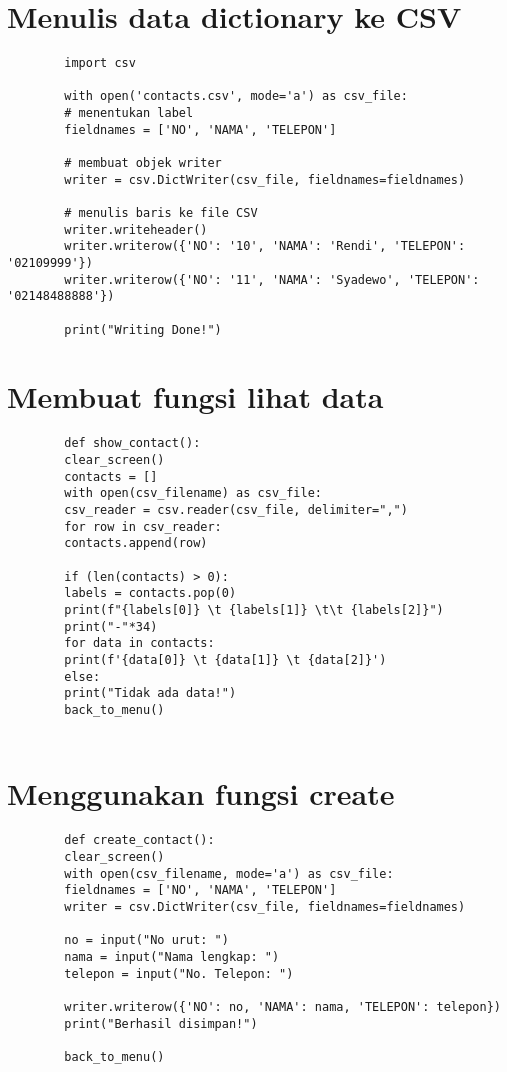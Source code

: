 \documentclass{article}
\begin{document}
	\section{ Menulis data dictionary ke CSV}
	\begin{lstlisting}
		import csv
		
		with open('contacts.csv', mode='a') as csv_file:
		# menentukan label
		fieldnames = ['NO', 'NAMA', 'TELEPON']
		
		# membuat objek writer
		writer = csv.DictWriter(csv_file, fieldnames=fieldnames)
		
		# menulis baris ke file CSV
		writer.writeheader()
		writer.writerow({'NO': '10', 'NAMA': 'Rendi', 'TELEPON': '02109999'})
		writer.writerow({'NO': '11', 'NAMA': 'Syadewo', 'TELEPON': '02148488888'})
		
		print("Writing Done!")
	\end{lstlisting}
	
	\section{Membuat fungsi lihat data}
	\begin{lstlisting}
		def show_contact():
		clear_screen()
		contacts = []
		with open(csv_filename) as csv_file:
		csv_reader = csv.reader(csv_file, delimiter=",")
		for row in csv_reader:
		contacts.append(row)
		
		if (len(contacts) > 0):
		labels = contacts.pop(0)
		print(f"{labels[0]} \t {labels[1]} \t\t {labels[2]}")
		print("-"*34)
		for data in contacts:
		print(f'{data[0]} \t {data[1]} \t {data[2]}')
		else:
		print("Tidak ada data!")
		back_to_menu()
		
	\end{lstlisting}
	
	\section{Menggunakan fungsi create}
	\begin{lstlisting}
		def create_contact():
		clear_screen()
		with open(csv_filename, mode='a') as csv_file:
		fieldnames = ['NO', 'NAMA', 'TELEPON']
		writer = csv.DictWriter(csv_file, fieldnames=fieldnames)
		
		no = input("No urut: ")
		nama = input("Nama lengkap: ")
		telepon = input("No. Telepon: ")
		
		writer.writerow({'NO': no, 'NAMA': nama, 'TELEPON': telepon})    
		print("Berhasil disimpan!")
		
		back_to_menu()
	\end{lstlisting}
	
\end{document}
